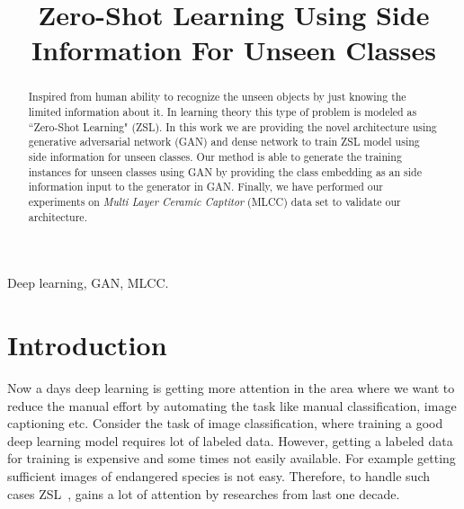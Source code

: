 \documentclass[11pt, conference, english]{IEEEtran}
\title{Zero-Shot Learning Using Side Information For Unseen Classes}
\author{
	\IEEEauthorblockN{Sanidhay Bhambay}
	\IEEEauthorblockA{Samsung Electro-Mechanics Software India Bangalore Pvt Limited\\
		\{sanidhay.bhambay\}@samsung.com}%
}
\theoremstyle{plain}
\theoremstyle{definition}
\theoremstyle{remark}
\begin{document}
{}

	\maketitle 
	\begin{abstract}
		Inspired from human ability to recognize the unseen objects by just knowing the limited information about it. In learning theory this type of problem is modeled as ``Zero-Shot Learning" (ZSL). In this work we are providing the novel architecture using generative adversarial network (GAN) and dense network to train ZSL model using side information for unseen classes. Our method is able to generate the training instances for unseen classes using GAN by providing the class embedding as an side information input to the generator in GAN. Finally, we have performed our experiments on \textit{Multi Layer Ceramic Captitor} (MLCC) data set to validate our architecture.
		
		
		
		
		
		
		
		
	\end{abstract}
	\begin{IEEEkeywords}
		Deep learning, GAN, MLCC.
	\end{IEEEkeywords}
	\section{Introduction}
	Now a days deep learning is getting more attention in the area where we want to reduce the 
	manual effort by automating the task like manual classification, image captioning etc. Consider the task of image classification,  where training a good deep learning model requires lot of labeled data. However, getting a labeled data for training is expensive and some times not easily available. For example getting sufficient images of endangered species is not easy. Therefore, to handle such cases ZSL~\cite{palatucci2009zero}, gains a lot of attention by researches from last one decade.
	
\end{document}

